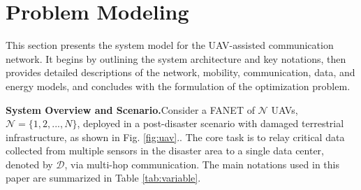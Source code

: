 \documentclass[runningheads]{llncs}
\begin{document}
\section{Problem Modeling}
\label{s3}
This section presents the system model for the UAV-assisted communication network. It begins by outlining the system architecture and key notations, then provides detailed descriptions of the network, mobility, communication, data, and energy models, and concludes with the formulation of the optimization problem.

\textbf{System Overview and Scenario.}Consider a FANET of $\mathcal{N}$ UAVs, $\mathcal{N}=\{1,2,...,N\}$, deployed in a post-disaster scenario with damaged terrestrial infrastructure, as shown in Fig. \ref{fig:uav}.. The core task is to relay critical data collected from multiple sensors in the disaster area to a single data center, denoted by $\mathcal{D}$, via multi-hop communication. The main notations used in this paper are summarized in Table \ref{tab:variable}.
\end{document}
